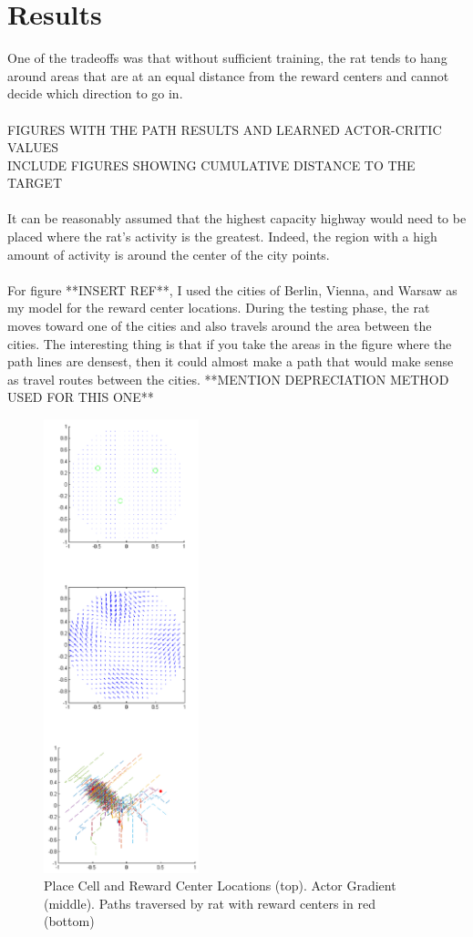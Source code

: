 \documentclass[conference]{IEEEtran}
\begin{document}
\section{Results}

One of the tradeoffs was that without sufficient training, the rat tends to hang around areas that are at an equal distance from the reward centers and cannot decide which direction to go in. \\
\\
FIGURES WITH THE PATH RESULTS AND LEARNED ACTOR-CRITIC VALUES\\
INCLUDE FIGURES SHOWING CUMULATIVE DISTANCE TO THE TARGET\\
\\
It can be reasonably assumed that the highest capacity highway would need to be placed where the rat's activity is the greatest. Indeed, the region with a high amount of activity is around the center of the city points. \\
\\
For figure **INSERT REF**, I used the cities of Berlin, Vienna, and Warsaw as my model for the reward center locations. During the testing phase, the rat moves toward one of the cities and also travels around the area between the cities. The interesting thing is that if you take the areas in the figure where the path lines are densest, then it could almost make a path that would make sense as travel routes between the cities. 
**MENTION DEPRECIATION METHOD USED FOR THIS ONE**

\begin{figure}
\includegraphics[width=0.4\textwidth]{waterMazeRevised2_Figure.png} 
\caption{Place Cell and Reward Center Locations (top). Actor Gradient (middle). Paths traversed by rat with reward centers in red (bottom)}
\end{figure}
\end{document}
